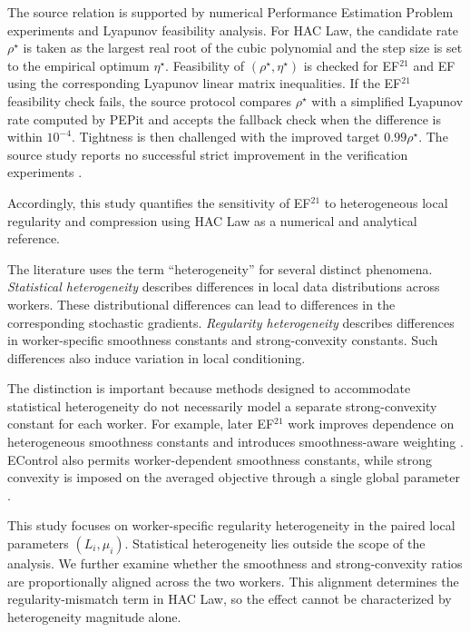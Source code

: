 The source relation is supported by numerical Performance Estimation Problem
experiments and Lyapunov feasibility analysis. For HAC Law, the
candidate rate $\rho^\star$ is taken as the largest real root of the cubic
polynomial and the step size is set to the empirical optimum $\eta^\star$.
Feasibility of $(\rho^\star,\eta^\star)$ is checked for EF$^{21}$ and EF
using the corresponding Lyapunov linear matrix inequalities. If the EF$^{21}$
feasibility check fails, the source protocol compares $\rho^\star$ with a
simplified Lyapunov rate computed by PEPit \citep{goujaud2024pepit} and accepts the fallback check when
the difference is within $10^{-4}$. Tightness is then challenged with the
improved target $0.99\rho^\star$. The source study reports no successful
strict improvement in the verification experiments \citep{thomsen2026tight}.

Accordingly, this study quantifies the sensitivity of EF$^{21}$ to heterogeneous local regularity and compression using HAC Law as a numerical and analytical reference.

The literature uses the term ``heterogeneity'' for several distinct phenomena.
\emph{Statistical heterogeneity} describes differences in local data
distributions across workers. These distributional differences can lead to
differences in the corresponding stochastic gradients.
\emph{Regularity heterogeneity} describes differences in worker-specific
smoothness constants and strong-convexity constants. Such differences also
induce variation in local conditioning.

The distinction is important because methods designed to accommodate
statistical heterogeneity do not necessarily model a separate
strong-convexity constant for each worker. For example, later EF$^{21}$ work
improves dependence on heterogeneous smoothness constants and introduces
smoothness-aware weighting \citep{richtarik2024reloaded}. EControl also permits
worker-dependent smoothness constants, while strong convexity is imposed on
the averaged objective through a single global parameter
\citep{gao2024econtrol}.

This study focuses on worker-specific regularity heterogeneity in the paired
local parameters $(L_i,\mu_i)$. Statistical heterogeneity lies outside the
scope of the analysis. We further examine whether the smoothness and
strong-convexity ratios are proportionally aligned across the two workers.
This alignment determines the regularity-mismatch term in HAC Law,
so the effect cannot be characterized by heterogeneity magnitude alone.

